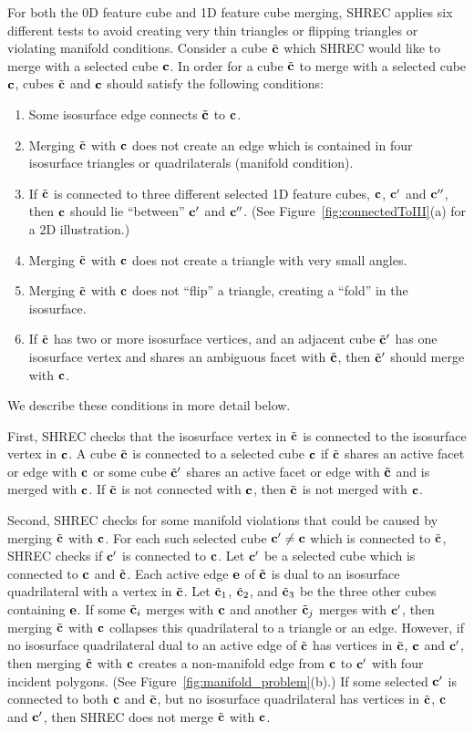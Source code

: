 For both the 0D feature cube and 1D feature cube merging,
SHREC applies six different tests to avoid creating very thin triangles
or flipping triangles or violating manifold conditions.
Consider a cube ${\tilde{\mathbf{c}}}$ which SHREC would like to merge 
with a selected cube $\mathbf{c}$.
In order for a cube ${\tilde{\mathbf{c}}}$ to merge with a selected cube $\mathbf{c}$,
cubes ${\tilde{\mathbf{c}}}$ and $\mathbf{c}$ should satisfy the following conditions:
\begin{enumerate}
\item Some isosurface edge connects ${\tilde{\mathbf{c}}}$ to $\mathbf{c}$.
\item Merging ${\tilde{\mathbf{c}}}$ with $\mathbf{c}$ does not create an edge 
which is contained in four isosurface triangles or quadrilaterals
(manifold condition).
\item If ${\tilde{\mathbf{c}}}$ is connected to three different selected 1D feature cubes,
$\mathbf{c}$, $\mathbf{c}'$ and $\mathbf{c}''$,
then $\mathbf{c}$ should lie ``between'' $\mathbf{c}'$ and $\mathbf{c}''$.
(See Figure~\ref{fig:connectedToIII}(a) for a 2D illustration.)
\item Merging ${\tilde{\mathbf{c}}}$ with $\mathbf{c}$ does not create a triangle
with very small angles.
\item Merging ${\tilde{\mathbf{c}}}$ with $\mathbf{c}$ does not ``flip'' a triangle,
creating a ``fold'' in the isosurface.
\item If ${\tilde{\mathbf{c}}}$ has two or more isosurface vertices,
and an adjacent cube ${\tilde{\mathbf{c}}}'$ has one isosurface vertex
and shares an ambiguous facet with ${\tilde{\mathbf{c}}}$,
then ${\tilde{\mathbf{c}}}'$ should merge with $\mathbf{c}$.
\end{enumerate}
We describe these conditions in more detail below.

First, SHREC checks that the isosurface vertex in ${\tilde{\mathbf{c}}}$
is connected to the isosurface vertex in $\mathbf{c}$.
A cube ${\tilde{\mathbf{c}}}$ is connected to a selected cube $\mathbf{c}$
if ${\tilde{\mathbf{c}}}$ shares an active facet or edge with $\mathbf{c}$
or some cube ${\tilde{\mathbf{c}}}'$ shares an active facet or edge with ${\tilde{\mathbf{c}}}$ and
is merged with $\mathbf{c}$.
If ${\tilde{\mathbf{c}}}$ is not connected with $\mathbf{c}$, then ${\tilde{\mathbf{c}}}$ is not merged with $\mathbf{c}$.

Second, SHREC checks for some manifold violations that
could be caused by merging ${\tilde{\mathbf{c}}}$ with $\mathbf{c}$.
For each such selected cube $\mathbf{c}' \neq \mathbf{c}$ which is connected to ${\tilde{\mathbf{c}}}$,
SHREC checks if $\mathbf{c}'$ is connected to $\mathbf{c}$.
Let $\mathbf{c}'$ be a selected cube which is connected to $\mathbf{c}$ and ${\tilde{\mathbf{c}}}$.
Each active edge $\mathbf{e}$ of ${\tilde{\mathbf{c}}}$ is dual to an isosurface quadrilateral
with a vertex in ${\tilde{\mathbf{c}}}$.
Let ${\tilde{\mathbf{c}}}_1$, ${\tilde{\mathbf{c}}}_2$, and ${\tilde{\mathbf{c}}}_3$ be the three other cubes containing $\mathbf{e}$.
If some ${\tilde{\mathbf{c}}}_i$ merges with $\mathbf{c}$ and another ${\tilde{\mathbf{c}}}_j$ merges with $\mathbf{c}'$,
then merging ${\tilde{\mathbf{c}}}$ with $\mathbf{c}$ collapses this quadrilateral to a triangle
or an edge.
However, if no isosurface quadrilateral dual to an active edge of ${\tilde{\mathbf{c}}}$
has vertices in ${\tilde{\mathbf{c}}}$, $\mathbf{c}$ and $\mathbf{c}'$,
then merging ${\tilde{\mathbf{c}}}$ with $\mathbf{c}$ creates a non-manifold edge 
from $\mathbf{c}$ to $\mathbf{c}'$ with four incident polygons.
(See Figure~\ref{fig:manifold_problem}(b).)
If some selected $\mathbf{c}'$ is connected to both $\mathbf{c}$ and ${\tilde{\mathbf{c}}}$,
but no isosurface quadrilateral has vertices in ${\tilde{\mathbf{c}}}$, $\mathbf{c}$ and $\mathbf{c}'$,
then SHREC does not merge ${\tilde{\mathbf{c}}}$ with $\mathbf{c}$.

